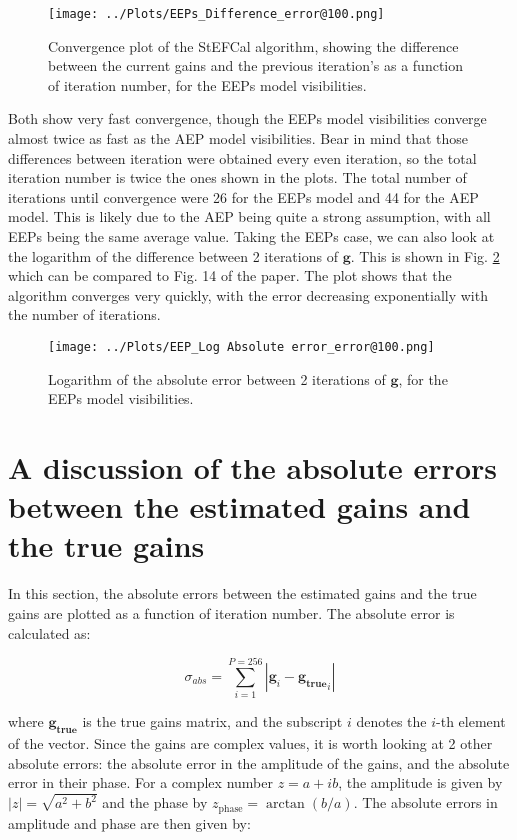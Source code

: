 \documentclass[12pt]{report} %
\begin{document}
\begin{figure}[h]
  \centering
  \texttt{[image: ../Plots/EEPs\_Difference\_error@100.png]}
  \caption{Convergence plot of the StEFCal algorithm, showing the difference between the current gains and the previous iteration's as a function of iteration number, for the EEPs model visibilities.}
  \label{fig:convergence_EEP}
\end{figure}

\newpage
Both show very fast convergence, though the EEPs model visibilities converge almost twice as fast as the AEP model visibilities. Bear in mind that those differences between iteration were obtained every even iteration, so the total iteration number is twice the ones shown in the plots. The total number of iterations until convergence were 26 for the EEPs model and 44 for the AEP model. This is likely due to the AEP being quite a strong assumption, with all EEPs being the same average value. Taking the EEPs case, we can also look at the logarithm of the difference between 2 iterations of $\mathbf{g}$. This is shown in Fig. \ref{fig:log_convergence_EEP} which can be compared to Fig. 14 of the paper\cite{salvini2014fast}. The plot shows that the algorithm converges very quickly, with the error decreasing exponentially with the number of iterations.


\begin{figure}[h]
  \centering
  \texttt{[image: ../Plots/EEP\_Log Absolute error\_error@100.png]}
  \caption{Logarithm of the absolute error between 2 iterations of $\mathbf{g}$, for the EEPs model visibilities.}
  \label{fig:log_convergence_EEP}
\end{figure}

\newpage
\section{A discussion of the absolute errors between the estimated gains and the true gains}

In this section, the absolute errors between the estimated gains and the true gains are plotted as a function of iteration number. The absolute error is calculated as:

\begin{equation}
    \sigma_{abs} = \sum_{i = 1}^{P = 256}|\mathbf{g}_{i} - \mathbf{g_{\text{true}}}_{i}|
\end{equation}

where $\mathbf{g_{\text{true}}}$ is the true gains matrix, and the subscript $i$ denotes the $i$-th element of the vector. Since the gains are complex values, it is worth looking at 2 other absolute errors: the absolute error in the amplitude of the gains, and the absolute error in their phase. For a complex number $z = a + ib$, the amplitude is given by $|z| = \sqrt{a^{2} + b^{2}}$ and the phase by $z_{\text{phase}} = \arctan(b/a)$. The absolute errors in amplitude and phase are then given by:
\end{document}
